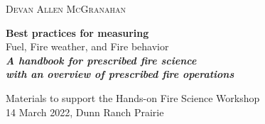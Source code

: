 	\raggedleft %
	
	\vspace*{\baselineskip} %
	
	
	\textsc{{\Large Devan Allen McGranahan}} %
	
	\vspace*{0.167\textheight} %
	
	
	\textbf{\LARGE Best practices for measuring} \\ 
	[\baselineskip] %
	
	{\textcolor{BisonGreen}{\Huge Fuel, Fire weather, and Fire behavior}}\\[\baselineskip] %
	
\textit{\textbf{\LARGE A handbook for prescribed fire science\\with an overview of prescribed fire operations}}\\[\baselineskip] %
\vspace*{1cm} %
	
	{\Large Materials to support the Hands-on Fire Science Workshop \\
	14 March 2022, Dunn Ranch Prairie} 
\vfill
\vspace*{2cm} %

\vfill 

	
	
	{\plogo }%
	
\vspace*{1\baselineskip} %